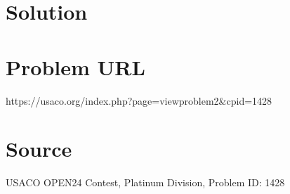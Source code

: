 \documentclass[12pt]{article}
\begin{document}
\section*{Solution}


\section*{Problem URL}
https://usaco.org/index.php?page=viewproblem2&cpid=1428

\section*{Source}
USACO OPEN24 Contest, Platinum Division, Problem ID: 1428
\end{document}
